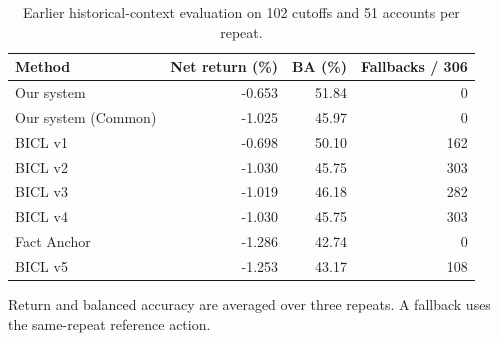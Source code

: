 \begin{table}[!htb]
\centering\small
\renewcommand{\arraystretch}{1.12}
\caption{Earlier historical-context evaluation on 102 cutoffs and 51 accounts per repeat.}
\label{tab:u09-comparison}
\begin{tabular}{@{}lrrr@{}}
\toprule
Method & Net return (\%) & BA (\%) & Fallbacks / 306\\
\midrule
Our system & -0.653 & 51.84 & 0\\
Our system (Common) & -1.025 & 45.97 & 0\\
\addlinespace
BICL v1 & -0.698 & 50.10 & 162\\
BICL v2 & -1.030 & 45.75 & 303\\
BICL v3 & -1.019 & 46.18 & 282\\
BICL v4 & -1.030 & 45.75 & 303\\
Fact Anchor & -1.286 & 42.74 & 0\\
BICL v5 & -1.253 & 43.17 & 108\\
\bottomrule
\end{tabular}
\par\smallskip
{\footnotesize Return and balanced accuracy are averaged over three
repeats. A fallback uses the same-repeat reference action.\par}
\end{table}

